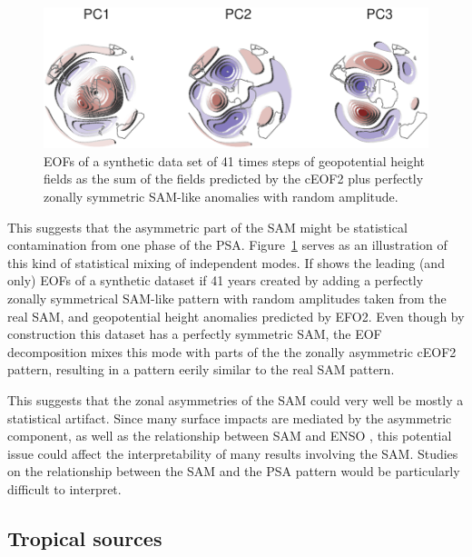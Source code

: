 \documentclass[smallextended]{svjour3}       %
\begin{document}
\begin{figure}
\centering
\includegraphics{../figures/fake-eof-1.pdf}
\caption{\label{fig:fake-eof}EOFs of a synthetic data set of 41 times steps of geopotential height fields as the sum of the fields predicted by the cEOF2 plus perfectly zonally symmetric SAM-like anomalies with random amplitude.}
\end{figure}

This suggests that the asymmetric part of the SAM might be statistical contamination from one phase of the PSA. Figure~\ref{fig:fake-eof} serves as an illustration of this kind of statistical mixing of independent modes. If shows the leading (and only) EOFs of a synthetic dataset if 41 years created by adding a perfectly zonally symmetrical SAM-like pattern with random amplitudes taken from the real SAM, and geopotential height anomalies predicted by EFO2. Even though by construction this dataset has a perfectly symmetric SAM, the EOF decomposition mixes this mode with parts of the the zonally asymmetric cEOF2 pattern, resulting in a pattern eerily similar to the real SAM pattern.

This suggests that the zonal asymmetries of the SAM could very well be mostly a statistical artifact. Since many surface impacts are mediated by the asymmetric component, as well as the relationship between SAM and ENSO \citep{campitelli2021}, this potential issue could affect the interpretability of many results involving the SAM. Studies on the relationship between the SAM and the PSA pattern would be particularly difficult to interpret.

\hypertarget{tropical-sources}{%
\subsection{Tropical sources}\label{tropical-sources}}
\end{document}
